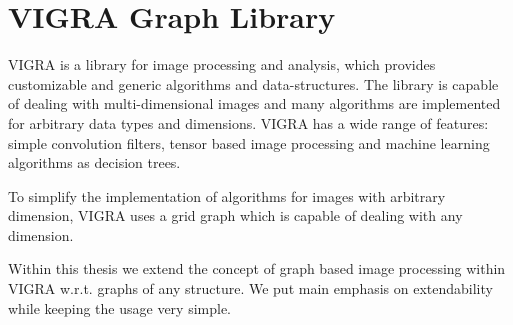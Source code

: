 \bigskip
\chapter{VIGRA Graph Library} \label{ch:vigra_graph_lib}

VIGRA \cite{software_vigra,koethe_2000_phd_thesis} is a library for image processing and analysis, 
which provides customizable and generic algorithms and data-structures.
The library is capable of dealing with multi-dimensional images 
and many algorithms are implemented for arbitrary data types
and dimensions.
VIGRA has a wide range of features: simple convolution filters, 
tensor based image processing and machine learning algorithms 
as decision trees.

To simplify the implementation of algorithms for images with arbitrary 
dimension, VIGRA uses a grid graph which is capable of
dealing with any dimension.

Within this thesis we extend the concept of graph based image processing
within VIGRA w.r.t. graphs of any structure.
We put main emphasis on extendability while keeping the usage very simple.


 

 

 